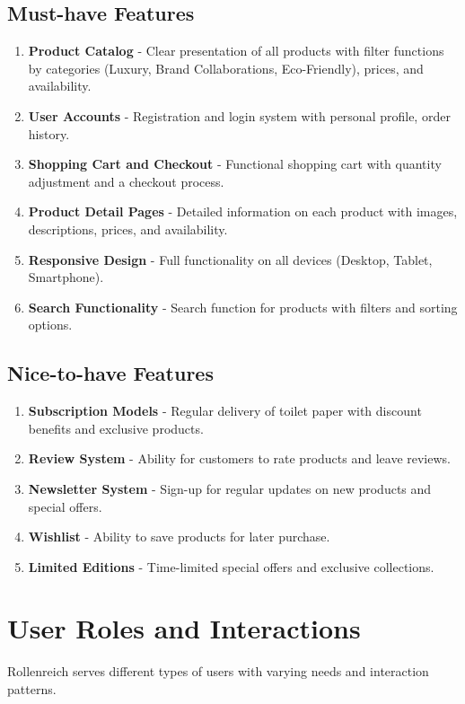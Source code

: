 \documentclass[a4paper,11pt]{article}
\begin{document}
\subsection{Must-have Features}
\begin{enumerate}[label=\textbf{MF\arabic*:}]
    \item \textbf{Product Catalog} - Clear presentation of all products with filter functions by categories (Luxury, Brand Collaborations, Eco-Friendly), prices, and availability.
    \item \textbf{User Accounts} - Registration and login system with personal profile, order history.
    \item \textbf{Shopping Cart and Checkout} - Functional shopping cart with quantity adjustment and a checkout process.
    \item \textbf{Product Detail Pages} - Detailed information on each product with images, descriptions, prices, and availability.
    \item \textbf{Responsive Design} - Full functionality on all devices (Desktop, Tablet, Smartphone).
    \item \textbf{Search Functionality} - Search function for products with filters and sorting options.
    \end{enumerate}

\subsection{Nice-to-have Features}
\begin{enumerate}[label=\textbf{NF\arabic*:}]
    \item \textbf{Subscription Models} - Regular delivery of toilet paper with discount benefits and exclusive products.
    \item \textbf{Review System} - Ability for customers to rate products and leave reviews.
    \item \textbf{Newsletter System} - Sign-up for regular updates on new products and special offers.
    \item \textbf{Wishlist} - Ability to save products for later purchase.
    \item \textbf{Limited Editions} - Time-limited special offers and exclusive collections.
\end{enumerate}

\section{User Roles and Interactions}
Rollenreich serves different types of users with varying needs and interaction patterns.
\end{document}

